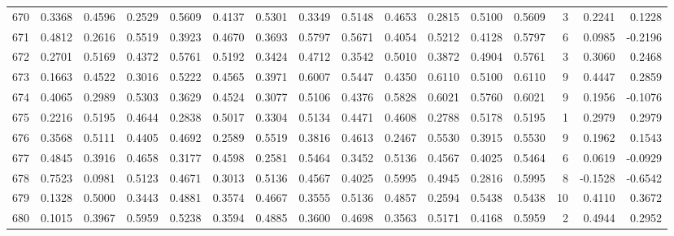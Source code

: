 \begin{tabular}{lrrrrrrrrrrrrrrr}
670 &      0.3368 &  0.4596 &  0.2529 &  0.5609 &  0.4137 &  0.5301 &  0.3349 &  0.5148 &  0.4653 &  0.2815 &   0.5100 &     0.5609 &      3 &                    0.2241 &                     0.1228 \\
671 &      0.4812 &  0.2616 &  0.5519 &  0.3923 &  0.4670 &  0.3693 &  0.5797 &  0.5671 &  0.4054 &  0.5212 &   0.4128 &     0.5797 &      6 &                    0.0985 &                    -0.2196 \\
672 &      0.2701 &  0.5169 &  0.4372 &  0.5761 &  0.5192 &  0.3424 &  0.4712 &  0.3542 &  0.5010 &  0.3872 &   0.4904 &     0.5761 &      3 &                    0.3060 &                     0.2468 \\
673 &      0.1663 &  0.4522 &  0.3016 &  0.5222 &  0.4565 &  0.3971 &  0.6007 &  0.5447 &  0.4350 &  0.6110 &   0.5100 &     0.6110 &      9 &                    0.4447 &                     0.2859 \\
674 &      0.4065 &  0.2989 &  0.5303 &  0.3629 &  0.4524 &  0.3077 &  0.5106 &  0.4376 &  0.5828 &  0.6021 &   0.5760 &     0.6021 &      9 &                    0.1956 &                    -0.1076 \\
675 &      0.2216 &  0.5195 &  0.4644 &  0.2838 &  0.5017 &  0.3304 &  0.5134 &  0.4471 &  0.4608 &  0.2788 &   0.5178 &     0.5195 &      1 &                    0.2979 &                     0.2979 \\
676 &      0.3568 &  0.5111 &  0.4405 &  0.4692 &  0.2589 &  0.5519 &  0.3816 &  0.4613 &  0.2467 &  0.5530 &   0.3915 &     0.5530 &      9 &                    0.1962 &                     0.1543 \\
677 &      0.4845 &  0.3916 &  0.4658 &  0.3177 &  0.4598 &  0.2581 &  0.5464 &  0.3452 &  0.5136 &  0.4567 &   0.4025 &     0.5464 &      6 &                    0.0619 &                    -0.0929 \\
678 &      0.7523 &  0.0981 &  0.5123 &  0.4671 &  0.3013 &  0.5136 &  0.4567 &  0.4025 &  0.5995 &  0.4945 &   0.2816 &     0.5995 &      8 &                   -0.1528 &                    -0.6542 \\
679 &      0.1328 &  0.5000 &  0.3443 &  0.4881 &  0.3574 &  0.4667 &  0.3555 &  0.5136 &  0.4857 &  0.2594 &   0.5438 &     0.5438 &     10 &                    0.4110 &                     0.3672 \\
680 &      0.1015 &  0.3967 &  0.5959 &  0.5238 &  0.3594 &  0.4885 &  0.3600 &  0.4698 &  0.3563 &  0.5171 &   0.4168 &     0.5959 &      2 &                    0.4944 &                     0.2952 \\

\end{tabular}
